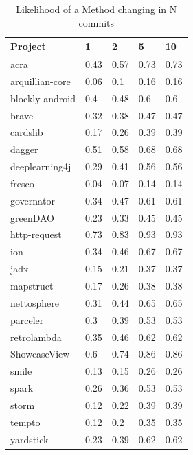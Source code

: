 \begin{table}
\begin{center}
    \begin{tabular}{|l|l|l|l|l|}
        \hline
        \textbf{Project} & \textbf{1} & \textbf{2} & \textbf{5} & \textbf{10} \\
        \hline
        acra & 0.43 & 0.57 & 0.73 & 0.73 \\
        arquillian-core & 0.06 & 0.1 & 0.16 & 0.16 \\
        blockly-android & 0.4 & 0.48 & 0.6 & 0.6 \\
        brave & 0.32 & 0.38 & 0.47 & 0.47 \\
        cardslib & 0.17 & 0.26 & 0.39 & 0.39 \\
        dagger & 0.51 & 0.58 & 0.68 & 0.68 \\
        deeplearning4j & 0.29 & 0.41 & 0.56 & 0.56 \\
        fresco & 0.04 & 0.07 & 0.14 & 0.14 \\
        governator & 0.34 & 0.47 & 0.61 & 0.61 \\
        greenDAO & 0.23 & 0.33 & 0.45 & 0.45 \\
        http-request & 0.73 & 0.83 & 0.93 & 0.93 \\
        ion & 0.34 & 0.46 & 0.67 & 0.67 \\
        jadx & 0.15 & 0.21 & 0.37 & 0.37 \\
        mapstruct & 0.17 & 0.26 & 0.38 & 0.38 \\
        nettosphere & 0.31 & 0.44 & 0.65 & 0.65 \\
        parceler & 0.3 & 0.39 & 0.53 & 0.53 \\
        retrolambda & 0.35 & 0.46 & 0.62 & 0.62 \\
        ShowcaseView & 0.6 & 0.74 & 0.86 & 0.86 \\
        smile & 0.13 & 0.15 & 0.26 & 0.26 \\
        spark & 0.26 & 0.36 & 0.53 & 0.53 \\
        storm & 0.12 & 0.22 & 0.39 & 0.39 \\
        tempto & 0.12 & 0.2 & 0.35 & 0.35 \\
        yardstick & 0.23 & 0.39 & 0.62 & 0.62 \\
        \hline
    \end{tabular}
\end{center}
    \caption{Likelihood of a Method changing in N commits}
    \label{tab:change_within_n_commits}
\end{table}

